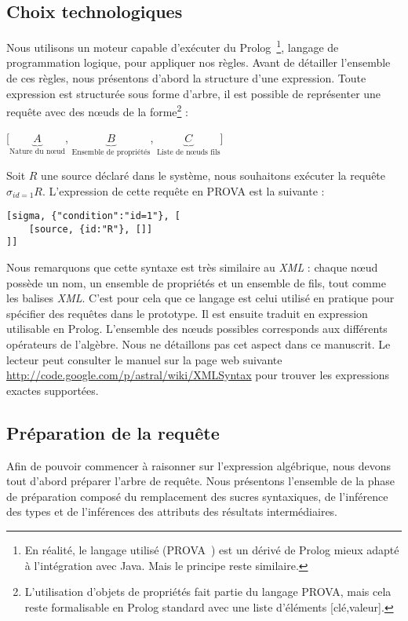 \subsection{Choix technologiques}
Nous utilisons un moteur capable d'exécuter du Prolog~\footnote{En réalité, le langage utilisé (PROVA~\cite{Kozlenkov:prova}) est un dérivé de Prolog mieux adapté à l'intégration avec Java. Mais le principe reste similaire.}, langage de programmation logique, pour appliquer nos règles. Avant de détailler l'ensemble de ces règles, nous présentons d'abord la structure d'une expression. Toute expression est structurée sous forme d'arbre, il est possible de représenter une requête avec des nœuds de la forme\footnote{L'utilisation d'objets de propriétés fait partie du langage PROVA, mais cela reste formalisable en Prolog standard avec une liste d'éléments [clé,valeur].} :
\begin{center} [$\underbrace{A}_{\textrm{Nature du nœud}}$, $\underbrace{B}_{\textrm{Ensemble de propriétés}}$, $\underbrace{C}_{\textrm{Liste de nœuds fils}}$] \end{center}
\begin{example}
	Soit $R$ une source déclaré dans le système, nous souhaitons exécuter la requête $\sigma_{id=1} R$. L'expression de cette requête en PROVA est la suivante :
	\begin{lstlisting}
[sigma,	{"condition":"id=1"}, [
	[source, {id:"R"}, []]
]]
	\end{lstlisting}
\end{example}
Nous remarquons que cette syntaxe est très similaire au \textit{XML} : chaque nœud possède un nom, un ensemble de propriétés et un ensemble de fils, tout comme les balises \textit{XML}. C'est pour cela que ce langage est celui utilisé en pratique pour spécifier des requêtes dans le prototype. Il est ensuite traduit en expression utilisable en Prolog. L'ensemble des nœuds possibles corresponds aux différents opérateurs de l'algèbre. Nous ne détaillons pas cet aspect dans ce manuscrit. Le lecteur peut consulter le manuel sur la page web suivante \url{http://code.google.com/p/astral/wiki/XMLSyntax} pour trouver les expressions exactes supportées.


\subsection{Préparation de la requête}
Afin de pouvoir commencer à raisonner sur l'expression algébrique, nous devons tout d'abord préparer l'arbre de requête. Nous présentons l'ensemble de la phase de préparation composé du remplacement des sucres syntaxiques, de l'inférence des types et de l'inférences des attributs des résultats intermédiaires.
